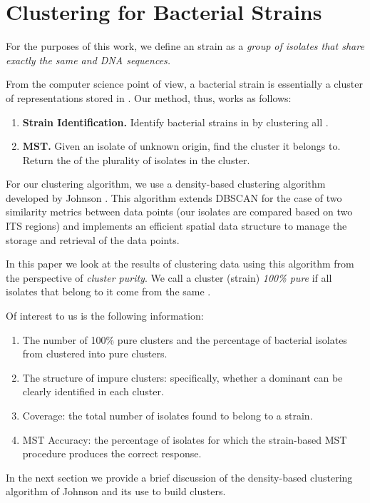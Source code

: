 \section{Clustering for Bacterial Strains}\label{sec:clusteringbs}
For the purposes of this work, we define an \ecoli{} strain as a \textit{group of \ecoli{} isolates that share exactly the same \Ssixt{} and \Sfive{} DNA sequences.}

From the computer science point of view, a bacterial strain is essentially a cluster of \ecoli{} \isol{} representations stored in \cplop{}.
Our \mst{} method, thus, works as follows:
\begin{enumerate}
    \item \textbf{Strain Identification.} Identify bacterial strains in \cplop{} by clustering
    all \cplop{} \isols{}.
    \item \textbf{MST.} Given an isolate of unknown origin, find the cluster it belongs to.
    Return the \spec{} of the plurality of isolates in the cluster.
\end{enumerate}

For our clustering algorithm, we use a density-based clustering algorithm
developed by Johnson \cite{johnson2015density}. This algorithm extends DBSCAN
for the case of two similarity metrics between data points (our isolates are compared
based on two ITS regions) and implements an efficient spatial data structure to manage
the storage and retrieval of the data points.

In this paper we look at the results of clustering \cplop{} data using this algorithm from the perspective of \textit{cluster purity}. We call a cluster (strain) \textit{100\% pure}
if all isolates that belong to it come from the same \spec{}. 

Of interest to us is the following information:
\begin{enumerate}
    \item The number of 100\% pure clusters and the percentage of bacterial isolates from \cplop{} clustered into pure clusters.
    \item The structure of impure clusters: specifically, whether a dominant \spec{} can
    be clearly identified in each cluster.
    \item Coverage: the total number of \cplop{} isolates found to belong to a strain.
    \item MST Accuracy: the percentage of isolates for which the strain-based MST procedure produces the correct response.
\end{enumerate}

In the next section we provide a brief discussion of the density-based clustering algorithm
of Johnson \cite{johnson2015density} and its use to build \cplop{} \isol{} clusters.
